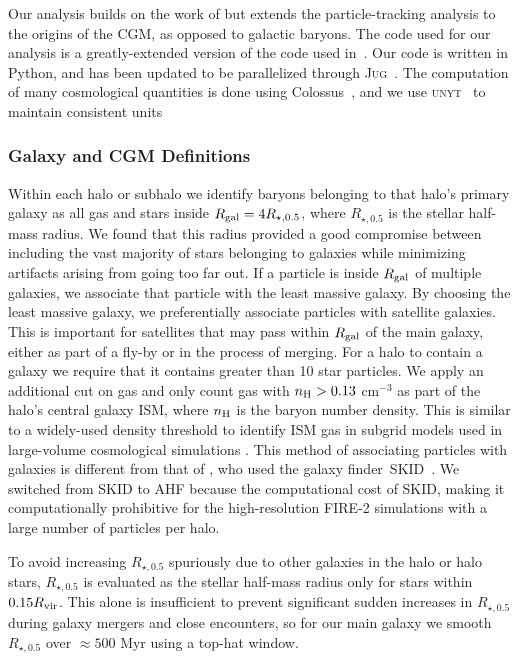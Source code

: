 \documentclass[fleqn,usenatbib]{mnras}
\begin{document}
Our analysis builds on the work of \cite{Angles-Alcazar2017} but extends the particle-tracking analysis to the origins of the CGM, as opposed to galactic baryons. 
The code used for our analysis is a greatly-extended version of the code used in~\cite{Angles-Alcazar2017}.
Our code is written in Python, and has been updated to be parallelized through \textsc{Jug}~\citep{Coelho2017}.
The computation of many cosmological quantities is done using Colossus~\citep{Diemer2017}, and we use \textsc{unyt}~\citep{Goldbaum2018} to maintain consistent units

\subsubsection{Galaxy and CGM Definitions}
\label{sec:galdef}

Within each halo or subhalo we identify baryons belonging to that halo's primary galaxy as all gas and stars inside $R_{\rm gal} = 4R_{\star,0.5}$, where $R_{\star,0.5}$ is the stellar half-mass radius. 
We found that this radius provided a good compromise between including the vast majority of stars belonging to galaxies while minimizing artifacts arising from going too far out.
If a particle is inside $R_{\rm gal}$ of multiple galaxies, we associate that particle with the least massive galaxy.
By choosing the least massive galaxy, we preferentially associate particles with satellite galaxies.
This is important for satellites that may pass within $R_{\rm gal}$ of the main galaxy, either as part of a fly-by or in the process of merging. 
For a halo to contain a galaxy we require that it contains greater than 10 star particles.
We apply an additional cut on gas and only count gas with $n_{\rm H} > 0.13$ cm$^{-3}$ as part of the halo's central galaxy ISM, where $n_{\rm H}$ is the baryon number density.
This is similar to a widely-used density threshold to identify ISM gas in subgrid models used in large-volume cosmological simulations \citep[e.g.,][]{2003MNRAS.339..289S,Ford2014}. 
This method of associating particles with galaxies is different from that of \cite{Angles-Alcazar2017}, who used the galaxy finder~\textsc{SKID}~\citep{Stadel2001}. 
We switched from SKID to AHF because the computational cost of \textsc{SKID}, making it computationally prohibitive for the high-resolution FIRE-2 simulations with a large number of particles per halo.

To avoid increasing $R_{\star, 0.5}$ spuriously due to other galaxies in the halo or halo stars, $R_{\star,0.5}$ is evaluated as the stellar half-mass radius only for stars within $0.15 R_{\rm vir}$.
This alone is insufficient to prevent significant sudden increases in $R_{\star,0.5}$ during galaxy mergers and close encounters, so for our main galaxy we smooth $R_{\star,0.5}$ over $\approx 500$ Myr using a top-hat window.
\end{document}
